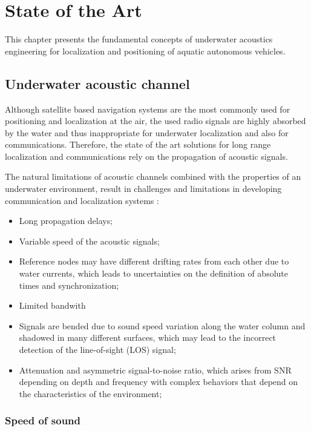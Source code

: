 \chapter{State of the Art} \label{chap:sota}

This chapter presents the fundamental concepts of underwater acoustics engineering for localization and positioning of aquatic autonomous vehicles.

\section{Underwater acoustic channel} \label{subsec: acoustic-channel}

Although satellite based navigation systems are the most commonly used for positioning and localization at the air, the used radio signals are highly absorbed by the water and thus inappropriate for underwater localization and also for communications. Therefore, the state of the art solutions for long range localization and communications rely on the propagation of acoustic signals.

The natural limitations of acoustic channels combined with the properties of an underwater environment, result in challenges and limitations in developing communication and localization systems \cite{survey-tech-chall}:
\begin{itemize}
	\item Long propagation delays;
	\item Variable speed of the acoustic signals;
	\item Reference nodes may have different drifting rates from each other due to water currents, which leads to uncertainties on the definition of absolute times and synchronization;
	\item Limited bandwith
	\item Signals are bended due to sound speed variation along the water column and shadowed in many different surfaces, which may lead to the incorrect detection of the line-of-sight (LOS) signal;
	\item Attenuation and asymmetric signal-to-noise ratio, which arises from SNR depending on depth and frequency with complex behaviors that depend on the characteristics of the environment;
\end{itemize}

\subsection{Speed of sound} \label{subsec: speed-sound}

